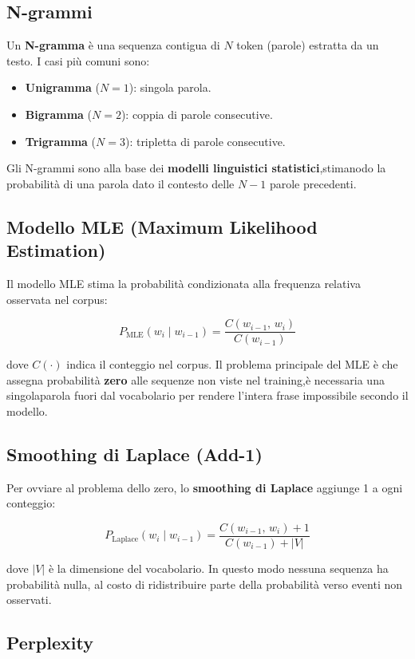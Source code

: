 ﻿\documentclass[12pt,a4paper]{article}
\begin{document}
\subsection{N-grammi}

Un \textbf{N-gramma} è una sequenza contigua di $N$ token (parole) estratta da un testo. I casi più comuni sono:
\begin{itemize}
  \item \textbf{Unigramma} ($N=1$): singola parola.
  \item \textbf{Bigramma} ($N=2$): coppia di parole consecutive.
  \item \textbf{Trigramma} ($N=3$): tripletta di parole consecutive.
\end{itemize}

Gli N-grammi sono alla base dei \textbf{modelli linguistici statistici},stimanodo la probabilità di una parola dato il contesto delle $N{-}1$ parole precedenti.

\subsection{Modello MLE (Maximum Likelihood Estimation)}

Il modello MLE stima la probabilità condizionata alla frequenza relativa osservata nel corpus:

\[
  P_{\text{MLE}}(w_i \mid w_{i-1}) = \frac{C(w_{i-1},\, w_i)}{C(w_{i-1})}
\]

dove $C(\cdot)$ indica il conteggio nel corpus. Il problema principale del MLE è che assegna probabilità \textbf{zero} alle sequenze non viste nel training,è necessaria una singolaparola fuori dal vocabolario per rendere l'intera frase impossibile secondo il modello.

\subsection{Smoothing di Laplace (Add-1)}

Per ovviare al problema dello zero, lo \textbf{smoothing di Laplace} aggiunge 1 a ogni conteggio:

\[
  P_{\text{Laplace}}(w_i \mid w_{i-1}) = \frac{C(w_{i-1},\, w_i) + 1}{C(w_{i-1}) + |V|}
\]

dove $|V|$ è la dimensione del vocabolario. In questo modo nessuna sequenza ha probabilità nulla, al costo di ridistribuire parte della probabilità verso eventi non osservati.

\subsection{Perplexity}
\end{document}
